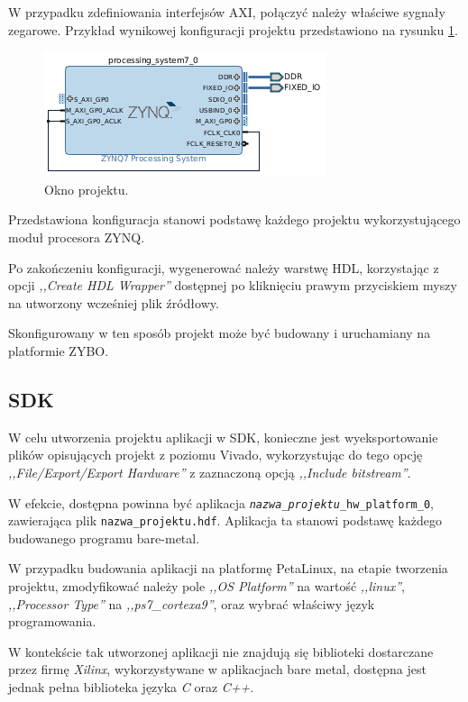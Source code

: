 W przypadku zdefiniowania interfejsów AXI, połączyć należy właściwe sygnały zegarowe. Przykład wynikowej konfiguracji projektu przedstawiono na rysunku \ref{fig:vivado-config-result}.

	\begin{figure}[ht]
		\centering
		\includegraphics[]{img/vivado/vivado-config-result.png}
		\caption{Okno projektu.}
		\label{fig:vivado-config-result}
	\end{figure}
	
Przedstawiona konfiguracja stanowi podstawę każdego projektu wykorzystującego moduł procesora ZYNQ.

Po zakończeniu konfiguracji, wygenerować należy warstwę HDL, korzystając z opcji \emph{,,Create HDL Wrapper''} dostępnej po kliknięciu prawym przyciskiem myszy na utworzony wcześniej plik źródłowy.

Skonfigurowany w ten sposób projekt może być budowany i uruchamiany na platformie ZYBO.
\subsection{SDK}

W celu utworzenia projektu aplikacji w SDK, konieczne jest wyeksportowanie plików opisujących projekt z poziomu Vivado, wykorzystując do tego opcję \emph{,,File/Export/Export Hardware''} z zaznaczoną opcją \emph{,,Include bitstream''}.

W efekcie, dostępna powinna być aplikacja \texttt{\textit{nazwa\_projektu}\_hw\_platform\_0}, zawierająca plik \texttt{nazwa\_projektu.hdf}. Aplikacja ta stanowi podstawę każdego budowanego programu bare-metal.

W przypadku budowania aplikacji na platformę PetaLinux, na etapie tworzenia projektu, zmodyfikować należy pole \emph{,,OS Platform''} na wartość \emph{,,linux''}, \emph{,,Processor Type''} na \emph{,,ps7\_cortexa9''}, oraz wybrać właściwy język programowania.

W kontekście tak utworzonej aplikacji nie znajdują się biblioteki dostarczane przez firmę \emph{Xilinx}, wykorzystywane w aplikacjach bare metal, dostępna jest jednak pełna biblioteka języka \emph{C} oraz \emph{C++}.

